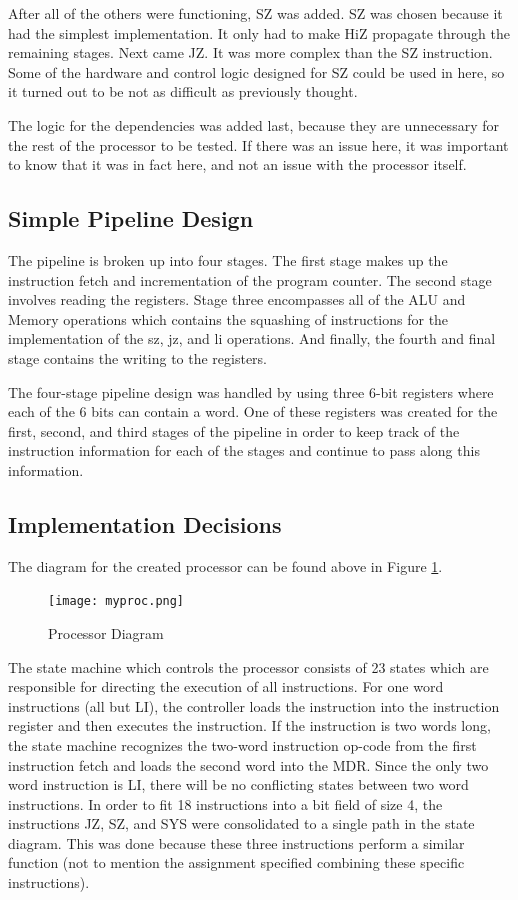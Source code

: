 \documentclass[conference]{IEEEtran}
\begin{document}
After all of the others were functioning, SZ was added. SZ was chosen because it had the simplest implementation. It only had to make HiZ propagate through the remaining stages. Next came JZ. It was more complex than the SZ instruction. Some of the hardware and control logic designed for SZ could be used in here, so it turned out to be not as difficult as previously thought. 

The logic for the dependencies was added last, because they are unnecessary for the rest of the processor to be tested. If there was an issue here, it was important to know that it was in fact here, and not an issue with the processor itself.

\subsection{Simple Pipeline Design}
The pipeline is broken up into four stages.  The first stage makes up the instruction fetch and incrementation of the program counter.  The second stage involves reading the registers.  Stage three encompasses all of the ALU and Memory operations which contains the squashing of instructions for the implementation of the sz, jz, and li operations.  And finally, the fourth and final stage contains the writing to the registers.

The four-stage pipeline design was handled by using three 6-bit registers where each of the 6 bits can contain a word.  One of these registers was created for the first, second, and third stages of the pipeline in order to keep track of the instruction information for each of the stages and continue to pass along this information.


\subsection{Implementation Decisions}
The diagram for the created processor can be found above in Figure \ref{fig:procDiagram}.
\begin{figure}
  \caption{Processor Diagram}
  \centering
    \texttt{[image: myproc.png]}
  \label{fig:procDiagram}
\end{figure}

The state machine which controls the processor consists of 23 states which are responsible for directing the execution of all instructions.
For one word instructions (all but LI), the controller loads the instruction into the instruction register and then executes the instruction.
If the instruction is two words long, the state machine recognizes the two-word instruction op-code from the first instruction fetch and loads the second word into the MDR. 
Since the only two word instruction is LI, there will be no conflicting states between two word instructions.
In order to fit 18 instructions into a bit field of size 4, the instructions JZ, SZ, and SYS were consolidated to a single path in the state diagram.
This was done because these three instructions perform a similar function (not to mention the assignment specified combining these specific instructions).
\end{document}
